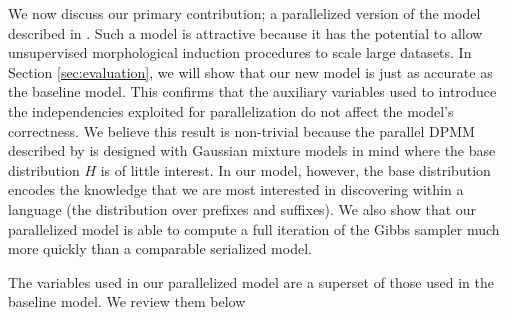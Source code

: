 We now discuss our primary contribution; a parallelized version of the
model described in \cite{goldwater2011}. Such a model is attractive
because it has the potential to allow unsupervised morphological
induction procedures to scale large datasets. In Section
\ref{sec:evaluation}, we will show that our new model is just as
accurate as the baseline model. This confirms that the auxiliary
variables used to introduce the independencies exploited for
parallelization do not affect the model's correctness. We believe this
result is non-trivial because the parallel DPMM described by
\cite{williamson2013} is designed with Gaussian mixture models in mind
where the base distribution $H$ is of little interest. In our model,
however, the base distribution encodes the knowledge that we are most
interested in discovering within a language (the distribution over
prefixes and suffixes). We also show that our parallelized model is
able to compute a full iteration of the Gibbs sampler much more
quickly than a comparable serialized model.

The variables used in our parallelized model are a superset of those
used in the baseline model. We review them below

